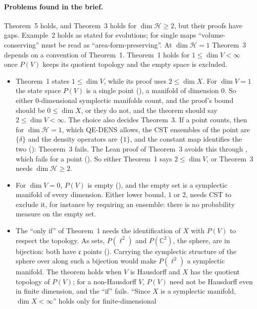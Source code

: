 \documentclass[11pt]{article}
\begin{document}
\paragraph{Problems found in the brief.} Theorem~5 holds, and Theorem~3 holds for
$\dim\mathcal H \ge 2$, but their proofs have gaps. Example~2 holds as stated for evolutions;
for single maps ``volume-conserving'' must be read as ``area-form-preserving''. At $\dim\mathcal H = 1$ Theorem~3 depends on a
convention of Theorem~1. Theorem~1 holds for $1 \le \dim V < \infty$ once $P(V)$ keeps its
quotient topology and the empty space is excluded.
\begin{itemize}
\item Theorem~1 states $1 \le \dim V$, while its proof uses $2 \le \dim X$. For $\dim V = 1$ the
  state space $P(V)$ is a single point (), a manifold of
  dimension $0$. So either $0$-dimensional symplectic manifolds count, and the proof's bound
  should be $0 \le \dim X$, or they do not, and the theorem should say $2 \le \dim V < \infty$.
  The choice also decides Theorem~3. If a point counts, then for $\dim\mathcal H = 1$, which
  QE-DENS allows, the CST ensembles of the point are $\{\delta\}$ and the density operators are
  $\{1\}$, and the constant map identifies the two ():
  Theorem~3 fails. The Lean proof of Theorem~3 avoids this through ,
  which fails for a point (). So either Theorem~1 says
  $2 \le \dim V$, or Theorem~3 needs $\dim\mathcal H \ge 2$.
\item For $\dim V = 0$, $P(V)$ is empty (), and the empty set is a
  symplectic manifold of every dimension. Either lower bound, $1$ or $2$, needs CST to exclude it,
  for instance by requiring an ensemble: there is no probability measure on the empty set.
\item The ``only if'' of Theorem~1 needs the identification of $X$ with $P(V)$ to respect the
  topology. As sets, $P(\ell^2)$ and $P(\mathbb C^2)$, the sphere, are in bijection: both have
  $\mathfrak c$ points (). Carrying the symplectic structure
  of the sphere over along such a bijection would make $P(\ell^2)$ a symplectic manifold. The
  theorem holds when $V$ is Hausdorff and $X$ has the quotient topology of $P(V)$; for a
  non-Hausdorff $V$, $P(V)$ need not be Hausdorff even in finite dimension, and the ``if'' fails.
  ``Since $X$ is a symplectic manifold, $\dim X < \infty$'' holds only for finite-dimensional

\end{itemize}
\end{document}
